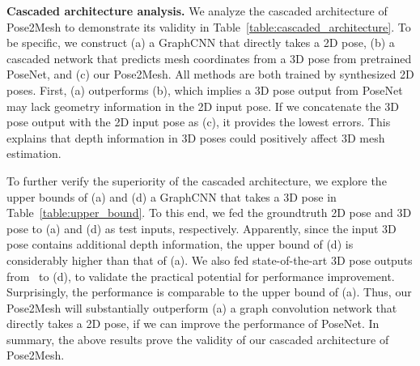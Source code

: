 \documentclass[runningheads]{llncs}
\begin{document}
\noindent\textbf{Cascaded architecture analysis.}
We analyze the cascaded architecture of Pose2Mesh to demonstrate its validity in Table~\ref{table:cascaded_architecture}.
To be specific, we construct (a) a GraphCNN that directly takes a 2D pose, (b) a cascaded network that predicts mesh coordinates from a 3D pose from pretrained PoseNet, and (c) our Pose2Mesh.
All methods are both trained by synthesized 2D poses.
First, (a) outperforms (b), which implies a 3D pose output from PoseNet may lack geometry information in the 2D input pose.
If we concatenate the 3D pose output with the 2D input pose as (c), it provides the lowest errors.
This explains that depth information in 3D poses could positively affect 3D mesh estimation.

To further verify the superiority of the cascaded architecture, we explore the upper bounds of (a) and (d) a GraphCNN that takes a 3D pose in Table~\ref{table:upper_bound}.
To this end, we fed the groundtruth 2D pose and 3D pose to (a) and (d) as test inputs, respectively.
Apparently, since the input 3D pose contains additional depth information, the upper bound of (d) is considerably higher than that of (a).
We also fed state-of-the-art 3D pose outputs from~\cite{moon2019camera} to (d), to validate the practical potential for performance improvement.
Surprisingly, the performance is comparable to the upper bound of (a).
Thus, our Pose2Mesh will substantially outperform (a) a graph convolution network that directly takes a 2D pose, if we can improve the performance of PoseNet. In summary, the above results prove the validity of our cascaded architecture of Pose2Mesh.


\begin{table}[t]
\setlength{\tabcolsep}{1pt}
\def\arraystretch{1.1}
\centering
{}
\end{table}
\vspace{-2mm}
\end{document}
